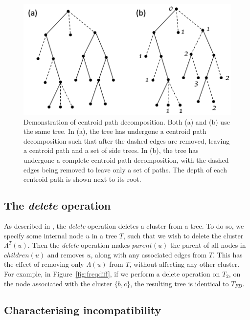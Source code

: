 \documentclass{article}
\newcommand{\leafset}{\Lambda}
\begin{document}
    \begin{figure}[h]
        \includegraphics[scale=0.5]{centroid}
        \centering
        \caption{Demonstration of centroid path decomposition. Both (a) and (b) use the same tree. In (a), the tree has undergone a centroid path decomposition such that after the dashed edges are removed, leaving a centroid path and a set of side trees. In (b), the tree has undergone a complete centroid path decomposition, with the dashed edges being removed to leave only a set of paths. The depth of each centroid path is shown next to its root.}
        \label{fig:centroid}
    \end{figure}

    \subsection{The \textit{delete} operation}
    \label{subsec:delete}

    As described in \cite{jansson2018algorithms}, the \textit{delete} operation deletes a cluster from a tree. To do so, we specify some internal node $u$ in a tree $T$, such that we wish to delete the cluster $\leafset^{T}(u)$. Then the \textit{delete} operation makes $parent(u)$ the parent of all nodes in $children(u)$ and removes $u$, along with any associated edges from $T$. This has the effect of removing only $\leafset(u)$ from $T$, without affecting any other cluster. For example, in Figure~\ref{fig:freqdiff}, if we perform a delete operation on $T_2$, on the node associated with the cluster $\{b, c\}$, the resulting tree is identical to $T_{FD}$.

    \subsection{Characterising incompatibility}
\end{document}
